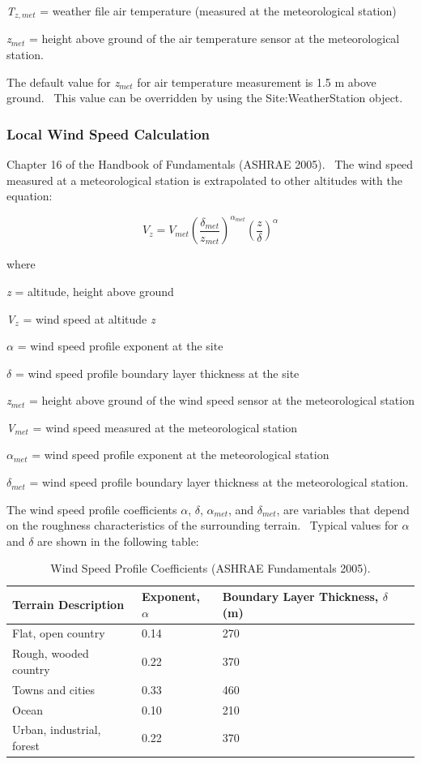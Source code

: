 \emph{T\(_{z,met}\)} = weather file air temperature (measured at the meteorological station)

\emph{z\(_{met}\)} = height above ground of the air temperature sensor at the meteorological station.

The default value for \emph{z\(_{met}\)} for air temperature measurement is 1.5 m above ground.~ This value can be overridden by using the Site:WeatherStation object.

\subsubsection{Local Wind Speed Calculation}\label{local-wind-speed-calculation}

Chapter 16 of the Handbook of Fundamentals (ASHRAE 2005).~ The wind speed measured at a meteorological station is extrapolated to other altitudes with the equation:

\begin{equation}
{V_z} = {V_{met}}{\left( {\frac{{{\delta_{met}}}}{{{z_{met}}}}} \right)^{{\alpha_{met}}}}{\left( {\frac{z}{\delta }} \right)^\alpha }
\end{equation}

where

\emph{z} = altitude, height above ground

\emph{V\(_{z}\)} = wind speed at altitude \emph{z}

\emph{$\alpha$} = wind speed profile exponent at the site

\emph{$\delta$} = wind speed profile boundary layer thickness at the site

\emph{z\(_{met}\)} = height above ground of the wind speed sensor at the meteorological station

\emph{V\(_{met}\)} = wind speed measured at the meteorological station

\emph{$\alpha$\(_{met}\)} = wind speed profile exponent at the meteorological station

\emph{$\delta$\(_{met}\)} = wind speed profile boundary layer thickness at the meteorological station.

The wind speed profile coefficients \emph{$\alpha$}, \emph{$\delta$}, \emph{$\alpha$\(_{met}\)}, and \emph{$\delta$\(_{met}\)}, are variables that depend on the roughness characteristics of the surrounding terrain.~ Typical values for \emph{$\alpha$} and \emph{$\delta$} are shown in the following table:

\begin{longtable}[c]{p{3.0in}p{1.5in}p{1.5in}}

\caption{Wind Speed Profile Coefficients (ASHRAE Fundamentals 2005). \label{table:wind-speed-profile-coefficients-ashrae}} \tabularnewline
\toprule
Terrain Description       & Exponent, $\alpha$ & Boundary Layer Thickness, $\delta$ (m) \tabularnewline
\midrule
\endhead

Flat, open country        & 0.14 & 270 \tabularnewline
Rough, wooded country     & 0.22 & 370 \tabularnewline
Towns and cities          & 0.33 & 460 \tabularnewline
Ocean                     & 0.10 & 210 \tabularnewline
Urban, industrial, forest & 0.22 & 370 \tabularnewline
\bottomrule
\end{longtable}


